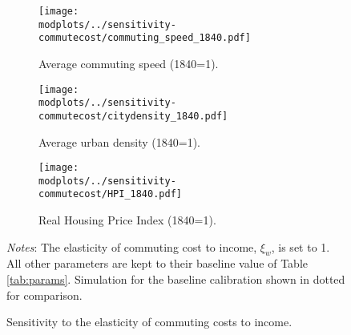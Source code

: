 \documentclass[./20250130-paper.tex]{subfiles}
\begin{document}




\begin{figure}[p]
	\begin{adjustbox}{center}
		\begin{subfigure}{\pthree\textwidth}
			\texttt{[image: \\modplots/../sensitivity-commutecost/commuting\_speed\_1840.pdf]}
			\caption{Average commuting speed (1840=1).\label{fig:model-sensi-commute-speed}}
		\end{subfigure}
		\begin{subfigure}{\pthree\textwidth}
			\texttt{[image: \\modplots/../sensitivity-commutecost/citydensity\_1840.pdf]}
			\caption{Average urban density (1840=1).\label{fig:model-sensi-commute-avgd}}
		\end{subfigure}
		\begin{subfigure}{\pthree\textwidth}
			\texttt{[image: \\modplots/../sensitivity-commutecost/HPI\_1840.pdf]}
			\caption{Real Housing Price Index (1840=1).\label{fig:model-sensi-commute-HPI}}		
		\end{subfigure}
	\end{adjustbox}
	\caption{Sensitivity to the elasticity of commuting costs to income.\label{fig:model-sensi-commute}}
	{\footnotesize \textit{Notes}: The elasticity of commuting cost to income, $\xi_w$, is set to 1. All other parameters are kept to their baseline value of Table \ref{tab:params}. Simulation for the baseline calibration shown in dotted for comparison.}\end{figure}
\end{document}
